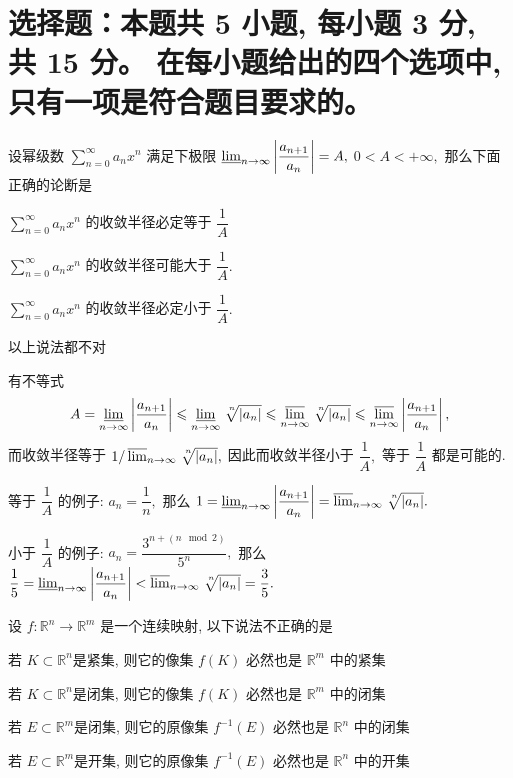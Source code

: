 \fi


\section{%
  选择题：本题共 5 小题, 每小题 3 分, 共 15 分。
  在每小题给出的四个选项中, 只有一项是符合题目要求的。
}


\begin{question}
  设幂级数 $\sum\limits_{n=0}^\infty a_n x^n$ 满足下极限 $\varliminf_{n\to\infty} \left\lvert \dfrac{a_{n+1}}{a_n} \right\rvert = A,$ $0 < A < +\infty,$ 那么下面正确的论断是 \paren[D]

  \begin{choices}
    \item $\sum\limits_{n=0}^\infty a_n x^n$ 的收敛半径必定等于 $\dfrac{1}{A}$
    \item $\sum\limits_{n=0}^\infty a_n x^n$ 的收敛半径可能大于 $\dfrac{1}{A}.$
    \item $\sum\limits_{n=0}^\infty a_n x^n$ 的收敛半径必定小于 $\dfrac{1}{A}.$
    \item 以上说法都不对
  \end{choices}
\end{question}

\begin{solution}
  有不等式
  $$A = \varliminf_{n\to\infty} \left\lvert \dfrac{a_{n+1}}{a_n} \right\rvert \leqslant \varliminf_{n\to\infty} \nroot[n]{\lvert a_n \rvert} \leqslant \varlimsup_{n\to\infty} \nroot[n]{\lvert a_n \rvert} \leqslant \varlimsup_{n\to\infty}  \left\lvert \dfrac{a_{n+1}}{a_n} \right\rvert,$$
  而收敛半径等于 $1 / \varlimsup_{n\to\infty} \nroot[n]{\lvert a_n \rvert},$ 因此而收敛半径小于 $\dfrac{1}{A},$ 等于 $\dfrac{1}{A}$ 都是可能的.

  等于 $\dfrac{1}{A}$ 的例子: $a_n = \dfrac{1}{n},$ 那么 $1 = \varliminf_{n\to\infty} \left\lvert \dfrac{a_{n+1}}{a_n} \right\rvert = \varlimsup_{n\to\infty} \nroot[n]{\lvert a_n \rvert}.$

  小于 $\dfrac{1}{A}$ 的例子: $a_n = \dfrac{3^{n + (n \mod 2)}}{5^n},$ 那么 $\dfrac{1}{5} = \varliminf_{n\to\infty} \left\lvert \dfrac{a_{n+1}}{a_n} \right\rvert < \varlimsup_{n\to\infty} \nroot[n]{\lvert a_n \rvert} = \dfrac{3}{5}.$
\end{solution}

\begin{question}
  设 $f: \mathbb{R}^n \to \mathbb{R}^m$ 是一个连续映射, 以下说法不正确的是 \paren[B]

  \begin{choices}
    \item 若 $K \subset \mathbb{R}^n$是紧集, 则它的像集 $f(K)$ 必然也是 $\mathbb{R}^m$ 中的紧集
    \item 若 $K \subset \mathbb{R}^n$是闭集, 则它的像集 $f(K)$ 必然也是 $\mathbb{R}^m$ 中的闭集
    \item 若 $E \subset \mathbb{R}^m$是闭集, 则它的原像集 $f^{-1}(E)$ 必然也是 $\mathbb{R}^n$ 中的闭集
    \item 若 $E \subset \mathbb{R}^m$是开集, 则它的原像集 $f^{-1}(E)$ 必然也是 $\mathbb{R}^n$ 中的开集
  \end{choices}
\end{question}

